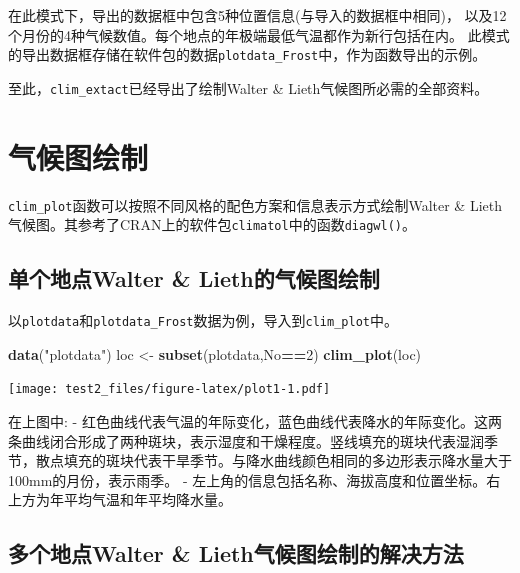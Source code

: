 \documentclass[
]{ctexart}
\newenvironment{Shaded}{\begin{snugshade}}{\end{snugshade}}
\newcommand{\DecValTok}[1]{\textcolor[rgb]{0.00,0.00,0.81}{#1}}
\newcommand{\FunctionTok}[1]{\textcolor[rgb]{0.13,0.29,0.53}{\textbf{#1}}}
\newcommand{\NormalTok}[1]{#1}
\newcommand{\OtherTok}[1]{\textcolor[rgb]{0.56,0.35,0.01}{#1}}
\newcommand{\SpecialCharTok}[1]{\textcolor[rgb]{0.81,0.36,0.00}{\textbf{#1}}}
\newcommand{\StringTok}[1]{\textcolor[rgb]{0.31,0.60,0.02}{#1}}
\begin{document}
\newpage

在此模式下，导出的数据框中包含5种位置信息(与导入的数据框中相同)，
以及12个月份的4种气候数值。每个地点的年极端最低气温都作为新行包括在内。
此模式的导出数据框存储在软件包的数据\texttt{plotdata\_Frost}中，作为函数导出的示例。

至此，\texttt{clim\_extact}已经导出了绘制Walter \&
Lieth气候图所必需的全部资料。

\hypertarget{ux6c14ux5019ux56feux7ed8ux5236}{%
\section{气候图绘制}\label{ux6c14ux5019ux56feux7ed8ux5236}}

\texttt{clim\_plot}函数可以按照不同风格的配色方案和信息表示方式绘制Walter
\&
Lieth气候图。其参考了CRAN上的软件包\texttt{climatol}中的函数\texttt{diagwl()}。

\hypertarget{ux5355ux4e2aux5730ux70b9walter-liethux7684ux6c14ux5019ux56feux7ed8ux5236}{%
\subsection{单个地点Walter \&
Lieth的气候图绘制}\label{ux5355ux4e2aux5730ux70b9walter-liethux7684ux6c14ux5019ux56feux7ed8ux5236}}

以\texttt{plotdata}和\texttt{plotdata\_Frost}数据为例，导入到\texttt{clim\_plot}中。

\begin{Shaded}
\begin{Highlighting}[]
\FunctionTok{data}\NormalTok{(}\StringTok{"plotdata"}\NormalTok{)}
\NormalTok{loc }\OtherTok{\textless{}{-}} \FunctionTok{subset}\NormalTok{(plotdata,No}\SpecialCharTok{==}\DecValTok{2}\NormalTok{)}
\FunctionTok{clim\_plot}\NormalTok{(loc)}
\end{Highlighting}
\end{Shaded}

\texttt{[image: test2\_files/figure-latex/plot1-1.pdf]}

在上图中: -
红色曲线代表气温的年际变化，蓝色曲线代表降水的年际变化。这两条曲线闭合形成了两种斑块，表示湿度和干燥程度。竖线填充的斑块代表湿润季节，散点填充的斑块代表干旱季节。与降水曲线颜色相同的多边形表示降水量大于100mm的月份，表示雨季。
-
左上角的信息包括名称、海拔高度和位置坐标。右上方为年平均气温和年平均降水量。

\hypertarget{ux591aux4e2aux5730ux70b9walter-liethux6c14ux5019ux56feux7ed8ux5236ux7684ux89e3ux51b3ux65b9ux6cd5}{%
\subsection{多个地点Walter \&
Lieth气候图绘制的解决方法}\label{ux591aux4e2aux5730ux70b9walter-liethux6c14ux5019ux56feux7ed8ux5236ux7684ux89e3ux51b3ux65b9ux6cd5}}
\end{document}
